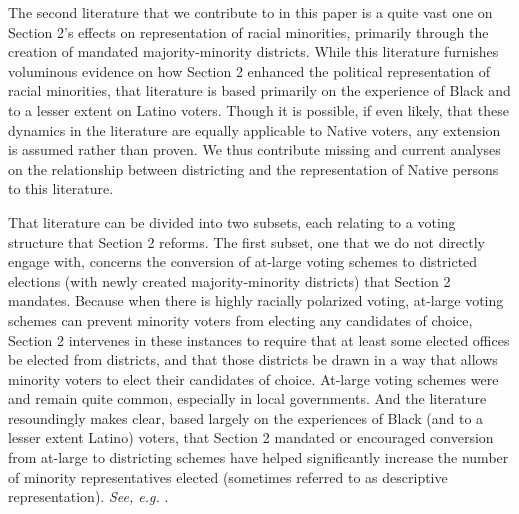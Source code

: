 \documentclass[12pt]{article}
\begin{document}
The second literature that we contribute to in this paper is a quite vast one on Section 2's effects on representation of racial minorities, primarily through the creation of mandated majority-minority districts. While this literature furnishes voluminous evidence on how Section 2 enhanced the political representation of racial minorities, that literature is based primarily on the experience of Black and to a lesser extent on Latino voters.  Though it is possible, if even likely, that these dynamics in the literature are equally applicable to Native voters, any extension is assumed rather than proven.  We thus contribute missing and current analyses on the relationship between districting and the representation of Native persons to this literature.

That literature can be divided into two subsets, each relating to a voting structure that Section 2 reforms.  The first subset, one that we do not directly engage with, concerns the conversion of at-large voting schemes to districted elections (with newly created majority-minority districts) that Section 2 mandates.  Because when there is highly racially polarized voting, at-large voting schemes can prevent minority voters from electing any candidates of choice, Section 2 intervenes in these instances to require that at least some elected offices be elected from districts, and that those districts be drawn in a way that allows minority voters to elect their candidates of choice.  At-large voting schemes were and remain quite common, especially in local governments.  And the literature resoundingly makes clear, based largely on the experiences of Black (and to a lesser extent Latino) voters, that Section 2 mandated or encouraged conversion from at-large to districting schemes have helped significantly increase the number of minority representatives elected (sometimes referred to as descriptive representation). \textit{See, e.g. }\cite{davidson1981atlarge,engstrom1981election,karnig1982electoral,meier1984impact,bullock1993election,marschall2010new,trounstine2008representation}.
\end{document}
